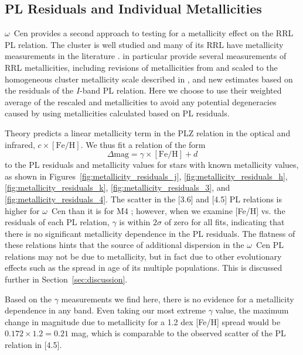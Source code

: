 \documentclass[a4paper,fleqn,usenatbib]{mnras}
\newcommand{\ocen}{$\omega$~Cen\xspace}
\begin{document}
\subsection{PL Residuals and Individual Metallicities}
\label{sec:residuals}

\ocen provides a second approach to testing for a metallicity effect on the RRL PL relation. The cluster is well studied and many of its RRL have metallicity measurements in the literature \citep[e.g.][]{2006ApJ...640L..43S, 2000AJ....119.1824R, 2016arXiv160904916B}. \citet{2016arXiv160904916B} in particular provide several measurements of RRL metallicities, including revisions of metallicities from \citet{2006ApJ...640L..43S} and \citet{2000AJ....119.1824R} scaled to the homogeneous cluster metallicity scale described in \citet{2009A&A...508..695C}, and new estimates based on the residuals of the $I$-band PL relation. Here we choose to use their weighted average of the rescaled \citet{2006ApJ...640L..43S} and \citet{2000AJ....119.1824R} metallicities to avoid any potential degeneracies caused by using metallicities calculated based on PL residuals.

Theory predicts a linear metallicity term in the PLZ relation in the optical and infrared, $c\times[\text{Fe/H}]$.
We thus fit a relation of the form
\begin{equation}
\label{eqn:delta_mag}
\Delta\text{mag} = \gamma \times[\text{Fe/H}] + d
\end{equation}
to the PL residuals and metallicity values for stars with known metallicity values, as shown in Figures~\ref{fig:metallicity_residuals_j}, \ref{fig:metallicity_residuals_h}, \ref{fig:metallicity_residuals_k}, \ref{fig:metallicity_residuals_3}, and \ref{fig:metallicity_residuals_4}. The scatter in the [3.6] and [4.5] PL relations is higher for \ocen than it is for M4 \citep{2015ApJ...808...11N, 2015ApJ...799..165B}; however, when we examine [Fe/H] vs. the residuals of each PL relation, $\gamma$ is within $2\sigma$ of zero for all fits, indicating that there is no significant metallicity dependence in the PL residuals. The flatness of these relations hints that the source of additional dispersion in the \ocen PL relations may not be due to metallicity, but in fact due to other evolutionary effects such as the spread in age of its multiple populations. This is discussed further in Section~\ref{sec:discussion}.

Based on the $\gamma$ measurements we find here, there is no evidence for a metallicity dependence in any band. Even taking our most extreme $\gamma$ value, the maximum change in magnitude due to metallicity for a 1.2 dex [Fe/H] spread would be $0.172 \times 1.2 = 0.21$ mag, which is comparable to the observed scatter of the PL relation in [4.5].
\end{document}
